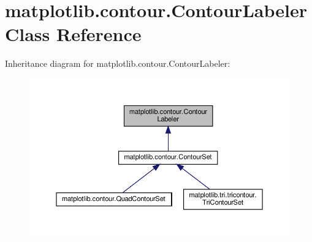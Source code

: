 \hypertarget{classmatplotlib_1_1contour_1_1ContourLabeler}{}\section{matplotlib.\+contour.\+Contour\+Labeler Class Reference}
\label{classmatplotlib_1_1contour_1_1ContourLabeler}


Inheritance diagram for matplotlib.\+contour.\+Contour\+Labeler\+:
\nopagebreak
\begin{figure}[H]
\begin{center}
\leavevmode
\includegraphics[width=350pt]{classmatplotlib_1_1contour_1_1ContourLabeler__inherit__graph}
\end{center}
\end{figure}
